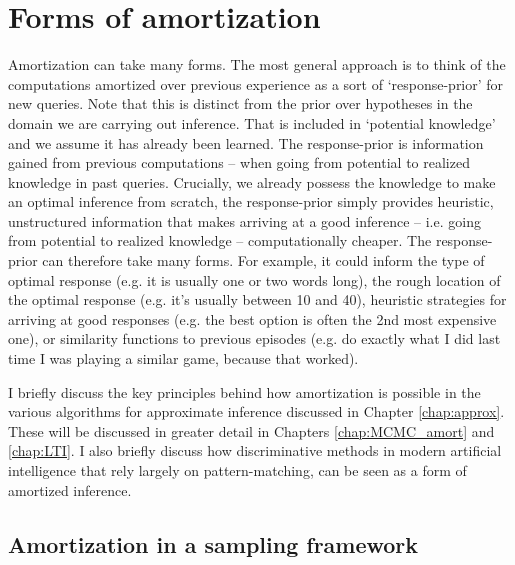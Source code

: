 
\section{Forms of amortization}

Amortization can take many forms. The most general approach is to think of the computations amortized over previous experience as a sort of `response-prior' for new queries. Note that this is distinct from the prior over hypotheses in the domain we are carrying out inference. That is included in `potential knowledge' and we assume it has already been learned. The response-prior is information gained from previous computations -- when going from potential to realized knowledge in past queries. Crucially, we already possess the knowledge to make an optimal inference from scratch, the response-prior simply provides heuristic, unstructured information that makes arriving at a good inference -- i.e. going from potential to realized knowledge -- computationally cheaper. The response-prior can therefore take many forms. For example, it could inform the type of optimal response (e.g. it is usually one or two words long), the rough location of the optimal response (e.g. it's usually between 10 and 40), heuristic strategies for arriving at good responses (e.g. the best option is often the 2nd most expensive one), or similarity functions to previous episodes (e.g. do exactly what I did last time I was playing a similar game, because that worked). 

I briefly discuss the key principles behind how amortization is possible in the various algorithms for approximate inference discussed in Chapter \ref{chap:approx}. These will be discussed in greater detail in Chapters \ref{chap:MCMC_amort} and \ref{chap:LTI}. I also briefly discuss how discriminative methods in modern artificial intelligence that rely largely on pattern-matching, can be seen as a form of amortized inference.

\subsection{Amortization in a sampling framework} 

